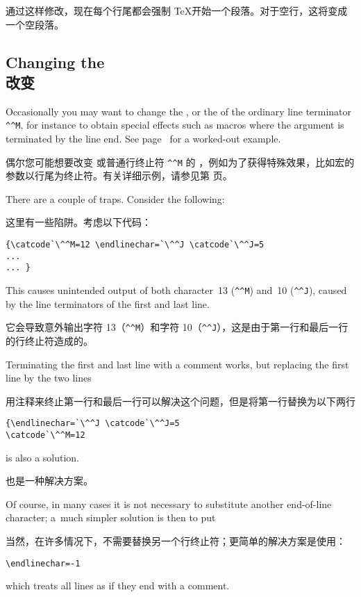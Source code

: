 通过这样修改，现在每个行尾都会强制 \TeX 开始一个段落。对于空行，这将变成一个空段落。


\subsection{Changing the \\改变 }

Occasionally you may want to change the , or
the  of the ordinary line terminator \verb.^^M.,
for instance to obtain special effects such as macros where 
the argument is terminated by the line end.
See page~\pageref{pick:eol} for a worked-out example.

偶尔您可能想要改变  或普通行终止符 \verb.^^M. 的 ，例如为了获得特殊效果，比如宏的参数以行尾为终止符。有关详细示例，请参见第 \pageref{pick:eol} 页。


There are  a couple of traps. Consider the following:

这里有一些陷阱。考虑以下代码：
\begin{verbatim}
{\catcode`\^^M=12 \endlinechar=`\^^J \catcode`\^^J=5
...
... }
\end{verbatim}
This causes unintended output of both character~13 (\verb-^^M-)
and~10 (\verb-^^J-), caused by the line terminators of the
first and last line.

它会导致意外输出字符 13（\verb-^^M-）和字符 10（\verb-^^J-），这是由于第一行和最后一行的行终止符造成的。

Terminating the first and  last line with a comment works,
but replacing the first line by the two lines

用注释来终止第一行和最后一行可以解决这个问题，但是将第一行替换为以下两行
\begin{verbatim}
{\endlinechar=`\^^J \catcode`\^^J=5
\catcode`\^^M=12
\end{verbatim}
is also a solution.

也是一种解决方案。

Of course, in many cases it is not necessary to substitute
another end-of-line character; a~much simpler solution 
is then to put 

当然，在许多情况下，不需要替换另一个行终止符；更简单的解决方案是使用：
\begin{verbatim}
\endlinechar=-1 
\end{verbatim}
which treats all lines as if they end with a comment.


